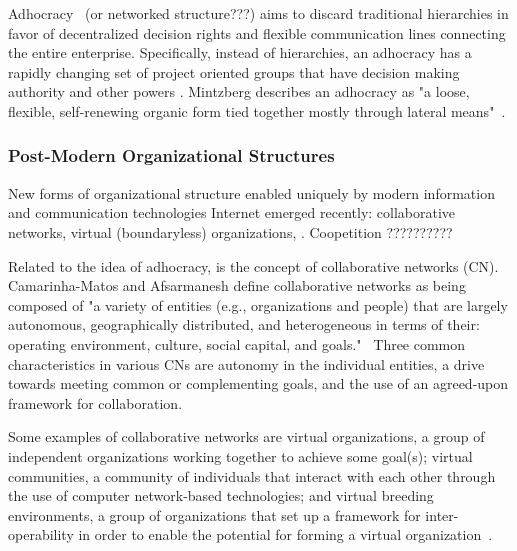 Adhocracy~\cite{applegate1988,pearlson2009} (or networked structure???) aims to discard traditional hierarchies in favor of decentralized decision rights and flexible communication lines connecting the entire enterprise. Specifically, instead of hierarchies, an adhocracy has a rapidly changing set of project oriented groups that have decision making authority and other powers  \cite{robbins1997}. Mintzberg describes an adhocracy as "a loose, flexible, self-renewing organic form tied together mostly through lateral means"~\cite{Mintzberg1979}.  

\subsubsection{Post-Modern Organizational Structures}

New forms of organizational structure enabled uniquely by modern information and communication technologies  Internet emerged recently:  collaborative networks, virtual (boundaryless) organizations,  \cite{?????}.  Coopetition ??????????


Related to the idea of adhocracy, is the concept of collaborative networks (CN). Camarinha-Matos and Afsarmanesh define collaborative networks as being composed of "a variety of entities (e.g., organizations and people) that are largely autonomous, geographically distributed, and heterogeneous in terms of their: operating environment, culture, social capital, and goals."~\cite{Camarinha-Matos2005} Three common characteristics in various CNs are autonomy in the individual entities, a drive towards meeting common or complementing goals, and the use of an agreed-upon framework for collaboration. 

Some examples of collaborative networks are virtual organizations, a group of independent organizations working together to achieve some goal(s); virtual communities, a community of individuals that interact with each other through the use of computer network-based technologies; and virtual breeding environments, a group of organizations that set up a framework for inter-operability in order to enable the potential for forming a virtual organization~\cite{Camarinha-Matos2005}. 

